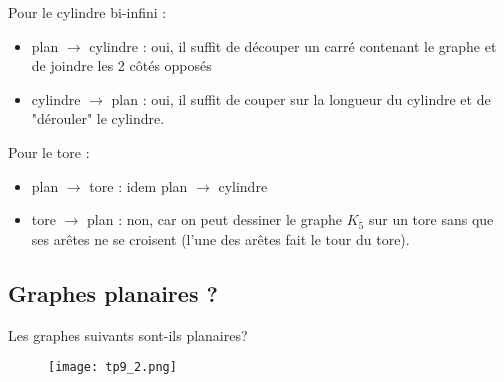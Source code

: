 \begin{solution}
Pour le cylindre bi-infini : 
\begin{itemize}
\item plan $\longrightarrow$ cylindre : oui, il suffit de découper un carré contenant le graphe et de joindre les 2 côtés opposés
\item cylindre $\longrightarrow$ plan : oui, il suffit de couper sur la longueur du cylindre et de "dérouler" le cylindre. \\
\end{itemize}

Pour le tore : 
\begin{itemize}
\item plan $\longrightarrow$ tore : idem plan $\longrightarrow$ cylindre
\item tore $\longrightarrow$ plan : non, car on peut dessiner le graphe $K_5$ sur un tore sans que ses arêtes ne se croisent (l'une des arêtes fait le tour du tore).
\end{itemize}
\end{solution}

\subsection{Graphes planaires ?} Les graphes suivants sont-ils planaires?

\begin{figure}[h!]
  \begin{center}
    \texttt{[image: tp9\_2.png]}
      \end{center}
\end{figure}


